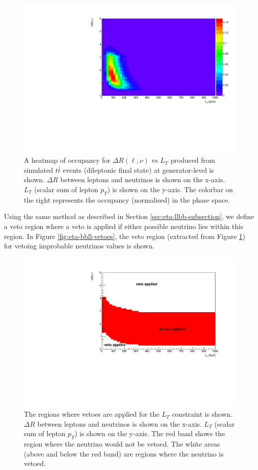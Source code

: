  \begin{figure}[h!]
	\includegraphics[width=0.6\linewidth]{figures/lt_occ_2vSM.pdf}
	\centering
	\caption{A heatmap of occupancy for $\Delta R (\ell, \nu)$ vs $L_{T}$ produced from simulated $t\bar{t}$ events (dileptonic final state) at generator-level is shown. $\Delta R$ between leptons and neutrinos is shown on the x-axis. $L_{T}$ (scalar sum of lepton $p_{T}$) is shown on the y-axis. The colorbar on the right represents the occupancy (normalised) in the phase space. }
	\label{fig:lt-heatmap}
\end{figure}

Using the same method as described in Section \ref{sec:eta-llbb-subsection}, we define a veto region where a veto is applied if either possible neutrino lies within this region. In Figure \ref{fig:eta-bbll-vetoes}, the veto region (extracted from Figure \ref{fig:lt-heatmap}) for vetoing improbable neutrinos values is shown.
\begin{figure}[h!]
	\includegraphics[scale=0.6]{figures/lt_veto_2vSM.pdf}
	\centering
	\caption{The regions where vetoes are applied for the $L_{T}$ constraint is shown. $\Delta R$ between leptons and neutrinos is shown on the x-axis. $L_{T}$ (scalar sum of lepton $p_{T}$) is shown on the y-axis. The red band shows the region where the neutrino would not be vetoed. The white areas (above and below the red band) are regions where the neutrino is vetoed.}
	\label{fig:lt-vetoes}
\end{figure}

